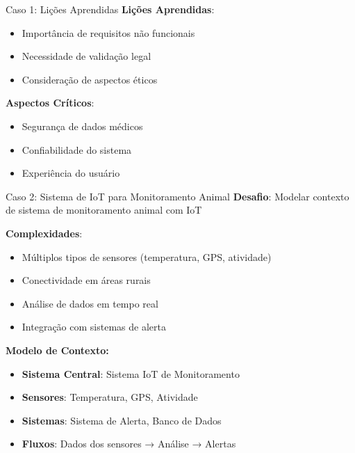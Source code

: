 \documentclass[aspectratio=169]{beamer}
\begin{document}
\begin{frame}{Caso 1: Lições Aprendidas}
\textbf{Lições Aprendidas}:
\begin{itemize}
\item Importância de requisitos não funcionais
\item Necessidade de validação legal
\item Consideração de aspectos éticos
\end{itemize}

\vspace{0.5cm}
\textbf{Aspectos Críticos}:
\begin{itemize}
\item Segurança de dados médicos
\item Confiabilidade do sistema
\item Experiência do usuário
\end{itemize}
\end{frame}

\begin{frame}{Caso 2: Sistema de IoT para Monitoramento Animal}
\textbf{Desafio}: Modelar contexto de sistema de monitoramento animal com IoT

\textbf{Complexidades}:
\begin{itemize}
\item Múltiplos tipos de sensores (temperatura, GPS, atividade)
\item Conectividade em áreas rurais
\item Análise de dados em tempo real
\item Integração com sistemas de alerta
\end{itemize}

\vspace{0.5cm}
\textbf{Modelo de Contexto:}
\begin{itemize}
\item \textbf{Sistema Central}: Sistema IoT de Monitoramento
\item \textbf{Sensores}: Temperatura, GPS, Atividade
\item \textbf{Sistemas}: Sistema de Alerta, Banco de Dados
\item \textbf{Fluxos}: Dados dos sensores → Análise → Alertas
\end{itemize}
\end{frame}
\end{document}
